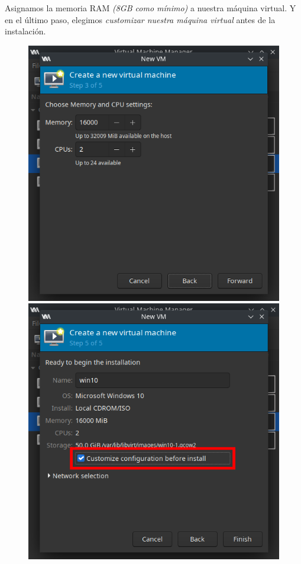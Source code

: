 \documentclass[11pt]{article}
\begin{document}
Asignamos la memoria RAM \textit{(8GB como mínimo)} a nuestra máquina virtual. Y en el último paso, elegimos \textit{customizar nuestra máquina virtual} antes de la instalación.

\begin{figure}[h]
	\centering
	\begin{minipage}[b]{0.4\textwidth}
		\includegraphics[width=\textwidth]{images/vm-memory-setup.png}
	\end{minipage}
	\begin{minipage}[b]{0.4\textwidth}
		\includegraphics[width=\textwidth]{images/vm-name.png}
	\end{minipage}
\end{figure}
\end{document}
